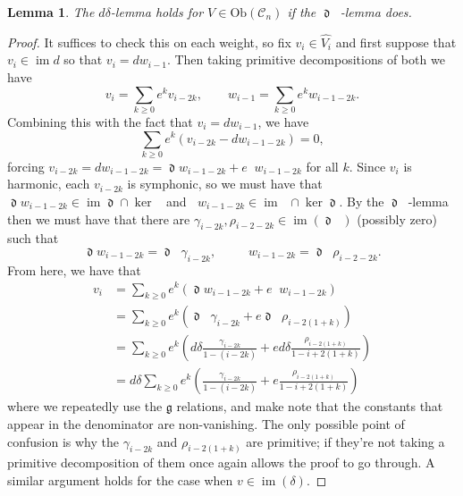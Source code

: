 \documentclass{amsart}
\newtheorem{lemma}[theorem]{Lemma}
\DeclareMathOperator{\dee}{\mathfrak{d}}
\DeclareMathOperator{\deebar}{\overline{\mathfrak{d}}}
\theoremstyle{definition}
\DeclareMathOperator{\im}{im}
\begin{document}
\begin{lemma}\label{deedeebarimpliesddelta}
    The $d\delta$-lemma holds for $V \in \mathrm{Ob}(\mathscr{C}_n)$ if the $\dee\deebar$-lemma does.
\end{lemma}
\begin{proof}
    It suffices to check this on each weight, so fix $v_i \in \widehat{V_i}$ and first suppose that $v_i \in \im d$ so that $v_i = dw_{i-1}$. Then taking primitive decompositions of both we have
    \begin{equation*}
        v_i = \sum_{k \geq 0}e^kv_{i-2k},\qquad w_{i-1} = \sum_{k \geq 0}e^kw_{i-1-2k}.
    \end{equation*}
    Combining this with the fact that $v_i=dw_{i-1}$, we have
    \begin{equation*}
        \sum_{k \geq 0} e^k(v_{i-2k}-dw_{i-1-2k})=0,
    \end{equation*}
    forcing $v_{i-2k} = dw_{i-1-2k} = \dee w_{i-1-2k}+e\deebar w_{i-1-2k}$ for all $k$. Since $v_i$ is harmonic, each $v_{i-2k}$ is symphonic, so we must have that $\dee w_{i-1-2k} \in \im \dee \cap \ker \deebar$ and $\deebar w_{i-1-2k} \in \im \deebar \cap \ker \dee$. By the $\dee \deebar$-lemma then we must have that there are $\gamma_{i-2k}, \rho_{i-2-2k} \in \im(\dee \deebar)$ (possibly zero) such that
    \begin{equation*}
        \dee w_{i-1-2k} = \dee \deebar \gamma_{i-2k},  \qquad \deebar w_{i-1-2k} = \dee \deebar \rho_{i-2-2k}.
    \end{equation*}
   From here, we have that 
   \begin{align*}
       v_i &= \sum_{k \geq 0} e^k (\dee w_{i-1-2k}+e\deebar w_{i-1-2k}) \\
       &= \sum_{k \geq 0} e^k (\dee \deebar \gamma_{i-2k} + e\dee\deebar \rho_{i-2(1+k)}) \\
       &= \sum_{k \geq 0} e^k \left( d\delta \frac{\gamma_{i-2k}}{1-(i-2k)} + e d \delta \frac{\rho_{i-2(1+k)}}{1-i+2(1+k)} \right) \\
       &=d\delta \sum_{k \geq 0}e^k \left(  \frac{\gamma_{i-2k}}{1-(i-2k)} + e  \frac{\rho_{i-2(1+k)}}{1-i+2(1+k)} \right)
   \end{align*}
   where we repeatedly use the $\mathfrak{g}$ relations, and make note that the constants that appear in the denominator are non-vanishing. The only possible point of confusion is why the $\gamma_{i-2k}$ and $\rho_{i-2(1+k)}$ are primitive; if they're not taking a primitive decomposition of them once again allows the proof to go through. A similar argument holds for the case when $v \in \im(\delta)$.
\end{proof}
\end{document}
